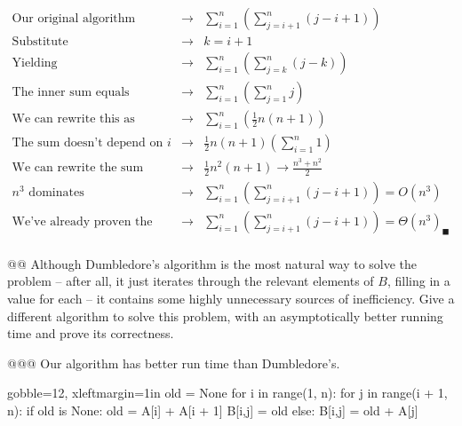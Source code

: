 \documentclass[10pt]{article}
\begin{document}
\begin{easylist}[enumerate]
        \[
            \begin{aligned}
                \text{Our original algorithm}        & \to & \sum^n_{i=1} \left( \sum^n_{j=i+1} \left( j - i + 1 \right) \right)\\
                \text{Substitute}                    & \to & k = i + 1\\
                \text{Yielding}                      & \to & \sum^n_{i=1} \left( \sum^n_{j=k} \left( j - k \right) \right)\\
                \text{The inner sum equals}          & \to & \sum^n_{i=1} \left( \sum^n_{j=1} j \right)\\
                \text{We can rewrite this as}        & \to & \sum^n_{i=1} \left( \frac{1}{2} n \left( n + 1 \right) \right)\\
                \text{The sum doesn't depend on $i$} & \to & \frac{1}{2} n \left( n + 1 \right) \left( \sum^n_{i=1} 1 \right)\\
                \text{We can rewrite the sum}        & \to & \frac{1}{2} n^2 \left( n + 1 \right) \to \frac{n^3 + n^2}{2}\\
                \text{$n^3$ dominates}               & \to & \sum^n_{i=1} \left( \sum^n_{j=i+1} \left( j - i + 1 \right) \right) = {O(n^3)}\\
                \text{We've already proven the upper bound}               & \to & \sum^n_{i=1} \left( \sum^n_{j=i+1} \left( j - i + 1 \right) \right) = {\Theta(n^3)}_\blacksquare\\
            \end{aligned}
        \]

    @@ Although Dumbledore's algorithm is the most natural way to solve the problem -- after all, it just iterates through the relevant elements of $B$, filling in a value for each -- it contains some highly unnecessary sources of inefficiency. Give a different algorithm to solve this problem, with an asymptotically better running time and prove its correctness.

    @@@ Our algorithm has better run time than Dumbledore's.

        \begin{pythoncode*}{gobble=12, xleftmargin=1in}
            old = None
            for i in range(1, n):
                for j in range(i + 1, n):
                    if old is None:
                        old = A[i] + A[i + 1]
                        B[i,j] = old
                    else:
                        B[i,j] = old + A[j]
        \end{pythoncode*}


\end{easylist}
\end{document}
